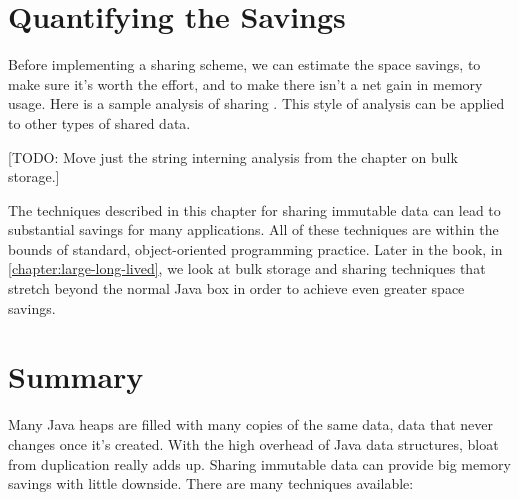 

\section{Quantifying the Savings}
\label{sec:quantifying-sharing-savings}

Before implementing a sharing scheme, we can estimate the
space savings, to make sure it's worth the effort, and to make there isn't a
net gain in memory usage.  Here is a sample analysis of sharing .
This style of analysis can be applied to other types of shared data.

[TODO: Move just the string interning analysis from the chapter on
bulk storage.]

The techniques described in this chapter for sharing immutable
data can lead to substantial savings for many applications.  All of these
techniques are within the bounds of standard, object-oriented programming
practice. Later in the book, in \autoref{chapter:large-long-lived}, we look at
bulk storage and sharing techniques that stretch beyond the normal Java box in
order to achieve even greater space savings. 




\section{Summary} 
Many Java heaps are filled with many copies of the same data, data that
never changes once it's created. With the high overhead of Java data structures,
bloat from duplication really adds up. Sharing immutable
data can provide big memory savings with little downside. There are many
techniques available:


